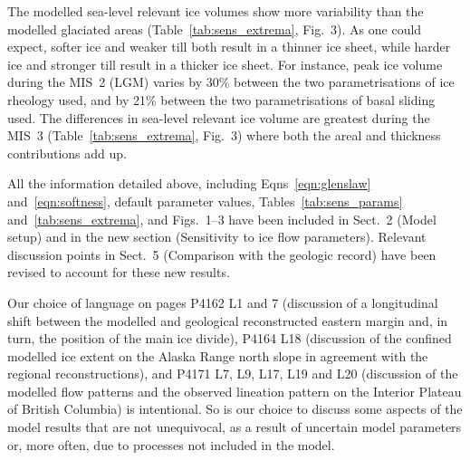 The modelled sea-level relevant ice volumes show more variability than the
modelled glaciated areas (Table~\ref{tab:sens_extrema},
Fig.~3). As one could expect, softer ice and weaker till both
result in a thinner ice sheet, while harder ice and stronger till result in a
thicker ice sheet. For instance, peak ice volume during the MIS~2 (LGM) varies
by 30\% between the two parametrisations of ice rheology used, and by 21\%
between the two parametrisations of basal sliding used. The differences in
sea-level relevant ice volume are greatest during the MIS~3
(Table~\ref{tab:sens_extrema}, Fig.~3) where both the areal and
thickness contributions add up.


All the information detailed above, including
Eqns~\ref{eqn:glenslaw} and~\ref{eqn:softness}, default parameter values,
Tables~\ref{tab:sens_params} and~\ref{tab:sens_extrema}, and
Figs.~1--3 have been included in Sect.~2
(Model setup) and in the new section (Sensitivity to ice flow parameters).
Relevant discussion points in Sect.~5 (Comparison with the geologic record)
have been revised to account for these new results.


Our choice of language on pages P4162 L1 and 7 (discussion of a longitudinal shift
between the modelled and geological reconstructed eastern margin and, in turn,
the position of the main ice divide), P4164 L18 (discussion of the confined
modelled ice extent on the Alaska Range north slope in agreement with the
regional reconstructions), and P4171
L7, L9, L17, L19 and L20 (discussion of the modelled flow patterns and the
observed lineation pattern on the Interior Plateau of British Columbia) is
intentional. So is our choice to discuss some aspects of the model results that
are not unequivocal, as a result of uncertain model parameters or, more often,
due to processes not included in the model.

